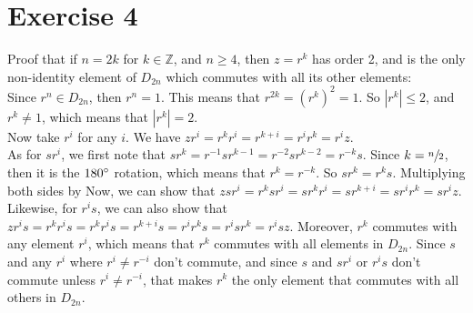 \documentclass{article}
\newcommand{\Z}{\mathbb{Z}}
\begin{document}
    \section*{Exercise 4}
    Proof that if $n = 2k$ for $k \in \Z$,
    and $n \geqslant 4$,
    then $z = r^k$ has order 2,
    and is the only non-identity element of $D_{2n}$
    which commutes with all its other elements: \\
    Since $r^n \in D_{2n}$,
    then $r^n = 1$.
    This means that $r^{2k} = (r^k)^2 = 1$.
    So $|r^k| \leqslant 2$,
    and $r^k \neq 1$,
    which means that $|r^k| = 2$. \\
    Now take $r^i$ for any $i$.
    We have $zr^i = r^kr^i = r^{k+i} = r^ir^k = r^iz$. \\
    As for $sr^i$,
    we first note that $sr^k = r^{-1}sr^{k-1} 
    = r^{-2}sr^{k-2}
    = r^{-k}s$.
    Since $k = \sfrac{n}{2}$,
    then it is the $180 \degree$ rotation, which means that $r^k = r^{-k}$.
    So $sr^k = r^ks$.
    Multiplying both sides by 
    Now, we can show that $zsr^i = r^ksr^i
    = sr^kr^i
    = sr^{k + i}
    = sr^ir^k
    = sr^iz$.
    Likewise, for $r^is$,
    we can also show that $zr^is = r^kr^is
    = r^kr^is
    = r^{k + i}s
    = r^ir^ks
    = r^isr^k
    = r^isz$.
    Moreover, $r^k$ commutes with any element $r^i$,
    which means that $r^k$ commutes with all elements in $D_{2n}$.
    Since $s$ and any $r^i$ where $r^i \neq r^{-i}$ don't commute,
    and since $s$ and $sr^i$ or $r^is$ don't commute unless $r^i \neq r^{-i}$,
    that makes $r^k$ the only element that commutes with all others
    in $D_{2n}$.
\end{document}

